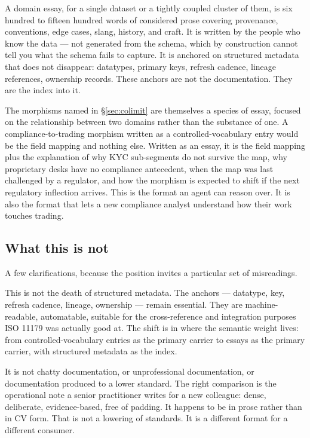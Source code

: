 \documentclass[11pt,a4paper]{article}
\begin{document}
A domain essay, for a single dataset or a tightly coupled cluster of them, is six hundred to fifteen hundred words of considered prose covering provenance, conventions, edge cases, slang, history, and craft. It is written by the people who know the data --- not generated from the schema, which by construction cannot tell you what the schema fails to capture. It is anchored on structured metadata that does not disappear: datatypes, primary keys, refresh cadence, lineage references, ownership records. These anchors are not the documentation. They are the index into it.

The morphisms named in \S\ref{sec:colimit} are themselves a species of essay, focused on the relationship between two domains rather than the substance of one. A compliance-to-trading morphism written as a controlled-vocabulary entry would be the field mapping and nothing else. Written as an essay, it is the field mapping plus the explanation of why KYC sub-segments do not survive the map, why proprietary desks have no compliance antecedent, when the map was last challenged by a regulator, and how the morphism is expected to shift if the next regulatory inflection arrives. This is the format an agent can reason over. It is also the format that lets a new compliance analyst understand how their work touches trading.

\subsection{What this is not}

A few clarifications, because the position invites a particular set of misreadings.

This is not the death of structured metadata. The anchors --- datatype, key, refresh cadence, lineage, ownership --- remain essential. They are machine-readable, automatable, suitable for the cross-reference and integration purposes ISO 11179 was actually good at. The shift is in where the semantic weight lives: from controlled-vocabulary entries as the primary carrier to essays as the primary carrier, with structured metadata as the index.

It is not chatty documentation, or unprofessional documentation, or documentation produced to a lower standard. The right comparison is the operational note a senior practitioner writes for a new colleague: dense, deliberate, evidence-based, free of padding. It happens to be in prose rather than in CV form. That is not a lowering of standards. It is a different format for a different consumer.
\end{document}

